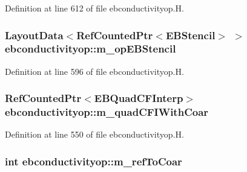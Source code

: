 Definition at line 612 of file ebconductivityop.\+H.

\subsubsection[{\texorpdfstring{m\+\_\+op\+E\+B\+Stencil}{m_opEBStencil}}]{\setlength{\rightskip}{0pt plus 5cm}Layout\+Data$<$Ref\+Counted\+Ptr$<$E\+B\+Stencil$>$ $>$ ebconductivityop\+::m\+\_\+op\+E\+B\+Stencil\hspace{0.3cm}{\ttfamily [protected]}}\hypertarget{classebconductivityop_a2c3401e8c149a7b9a45ef713b596a9db}{}\label{classebconductivityop_a2c3401e8c149a7b9a45ef713b596a9db}


Definition at line 596 of file ebconductivityop.\+H.

\subsubsection[{\texorpdfstring{m\+\_\+quad\+C\+F\+I\+With\+Coar}{m_quadCFIWithCoar}}]{\setlength{\rightskip}{0pt plus 5cm}Ref\+Counted\+Ptr$<$E\+B\+Quad\+C\+F\+Interp$>$ ebconductivityop\+::m\+\_\+quad\+C\+F\+I\+With\+Coar\hspace{0.3cm}{\ttfamily [protected]}}\hypertarget{classebconductivityop_aed80cfecb0c9b0589c0cf4cdc81a84c3}{}\label{classebconductivityop_aed80cfecb0c9b0589c0cf4cdc81a84c3}


Definition at line 550 of file ebconductivityop.\+H.

\subsubsection[{\texorpdfstring{m\+\_\+ref\+To\+Coar}{m_refToCoar}}]{\setlength{\rightskip}{0pt plus 5cm}int ebconductivityop\+::m\+\_\+ref\+To\+Coar\hspace{0.3cm}{\ttfamily [protected]}}\hypertarget{classebconductivityop_ae7b853b8846354622396507961b7d764}{}\label{classebconductivityop_ae7b853b8846354622396507961b7d764}



